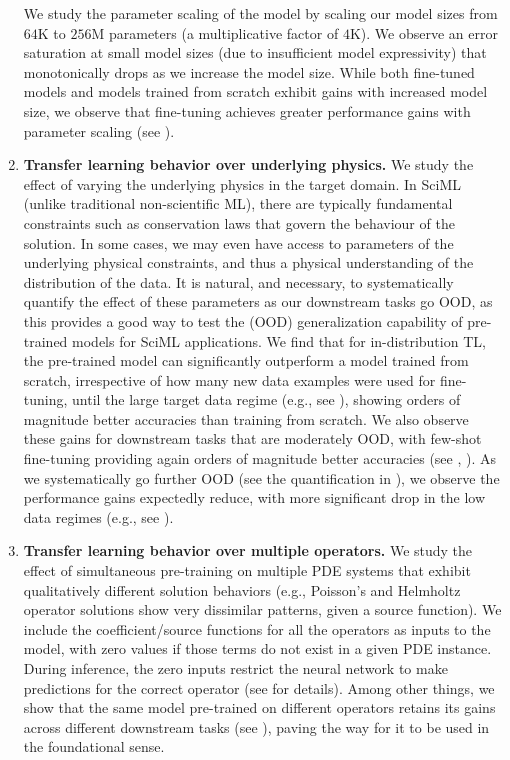 \begin{enumerate}
    We study the parameter scaling of the model by scaling our model sizes from $64$K to $256$M parameters (a multiplicative factor of $4$K). 
    We observe an error saturation at small model sizes (due to insufficient model expressivity) that monotonically drops as we increase the model size. 
    While both fine-tuned models and models trained from scratch exhibit gains with increased model size, we observe that fine-tuning achieves greater performance gains with parameter scaling (see ).
    \item 
    \textbf{Transfer learning behavior over underlying physics.}
    We study the effect of varying the underlying physics in the target domain.
    In SciML (unlike traditional non-scientific ML), there are typically fundamental constraints such as conservation laws that govern the behaviour of the solution. 
    In some cases, we may even have access to parameters of the underlying physical constraints, and thus a physical understanding of the distribution of the data.
    It is natural, and necessary, to systematically quantify the effect of these parameters as our downstream tasks go OOD, as this provides a good way to test the (OOD) generalization capability of pre-trained models for SciML applications.
    We find that for in-distribution TL, the pre-trained model can significantly outperform a model trained from scratch, irrespective of how many new data examples were used for fine-tuning, until the large target data regime (e.g., see ), showing orders of magnitude better accuracies than training from scratch.
    We also observe these gains for downstream tasks that are moderately OOD, with few-shot fine-tuning providing again orders of magnitude better accuracies (see , ).
    As we systematically go further OOD (see the quantification in ), we observe the performance gains expectedly reduce, with more significant drop in the low data regimes (e.g., see ).
    \item 
    \textbf{Transfer learning behavior over multiple operators.}
    We study the effect of simultaneous pre-training on multiple PDE systems that exhibit qualitatively different solution behaviors (e.g., Poisson's and Helmholtz operator solutions show very dissimilar patterns, given a source function). 
    We include the coefficient/source functions for all the operators as inputs to the model, with zero values if those terms do not exist in a given PDE instance. During inference, the zero inputs restrict the neural network to make predictions for the correct operator (see  for details).
    Among other things, we show that the same model pre-trained on different operators retains its gains across different downstream tasks (see ), paving the way for it to be used in the foundational sense.
\end{enumerate}


